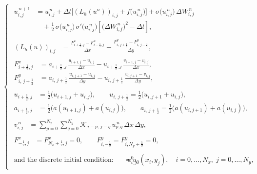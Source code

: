 \documentclass[10pt,number,preprint,times]{elsarticle}
\numberwithin{equation}{section} %
\begin{document}
\begin{equation}\label{discretesystem}
	\begin{cases}
		\begin{aligned}
			u_{i,j}^{\,n+1} &= u_{i,j}^{\,n}
			+ \Delta t\Big[(L_h(u^{n}))_{i,j} + f\!\big(u_{i,j}^{\,n}\big)\Big]
			+ \sigma\!\big(u_{i,j}^{\,n}\big)\,\Delta W_{i,j}^{\,n} \\[1ex]
			&\quad + \tfrac12\,\sigma\!\big(u_{i,j}^{\,n}\big)\,\sigma'\!\big(u_{i,j}^{\,n}\big)
			\left[\big(\Delta W_{i,j}^{\,n}\big)^2 - \Delta t\right],
		\end{aligned} \\[4ex]
		
		\begin{aligned}
			(L_h(u))_{i,j}
			&= \frac{F^{x}_{i+\tfrac12,j}-F^{x}_{i-\tfrac12,j}}{\Delta x}
			+ \frac{F^{y}_{i,\,j+\tfrac12}-F^{y}_{i,\,j-\tfrac12}}{\Delta y},
		\end{aligned} \\[4ex]
		
		\begin{aligned}
			F^{x}_{i+\tfrac12,j} &= a_{i+\tfrac12,j}\,\frac{u_{i+1,j}-u_{i,j}}{\Delta x}
			- u_{i+\tfrac12,j}\,\frac{v_{i+1,j}-v_{i,j}}{\Delta x}, \\[1ex]
			F^{y}_{i,\,j+\tfrac12} &= a_{i,\,j+\tfrac12}\,\frac{u_{i,j+1}-u_{i,j}}{\Delta y}
			- u_{i,\,j+\tfrac12}\,\frac{v_{i,j+1}-v_{i,j}}{\Delta y},
		\end{aligned} \\[4ex]
		
		\begin{aligned}
			u_{i+\tfrac12,j} &= \tfrac12\big(u_{i+1,j}+u_{i,j}\big), \qquad
			u_{i,\,j+\tfrac12} = \tfrac12\big(u_{i,j+1}+u_{i,j}\big), \\[1ex]
			a_{i+\tfrac12,j} &= \tfrac12\big(a(u_{i+1,j})+a(u_{i,j})\big), \qquad
			a_{i,\,j+\tfrac12} = \tfrac12\big(a(u_{i,j+1})+a(u_{i,j})\big),
		\end{aligned} \\[4ex]
		
		\begin{aligned}
			v_{i,j}^{\,n} &= \sum_{p=0}^{N_x}\sum_{q=0}^{N_y}
			\mathcal{K}_{\,i-p,\,j-q}\,u_{p,q}^{\,n}\,\Delta x\,\Delta y,
		\end{aligned} \\[4ex]
		
		\begin{aligned}
			F^{x}_{-\tfrac12,j} &= F^{x}_{N_x+\tfrac12,j}=0, \qquad
			F^{y}_{i,-\tfrac12}=F^{y}_{i,N_y+\tfrac12}=0,
		\end{aligned} \\[4ex]
		
		\begin{aligned}
			\text{and the discrete initial condition:}\qquad
			u_{i,j}^0 &= u_0(x_i,y_j), \quad i=0,\dots,N_x,\; j=0,\dots,N_y,
		\end{aligned}
	\end{cases}
\end{equation}
\end{document}
